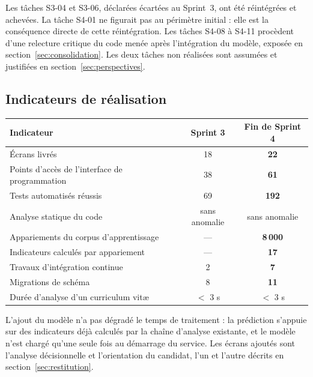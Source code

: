 \documentclass[11pt,a4paper]{article}
\begin{document}
\vspace{2mm}
\noindent Les tâches S3-04 et S3-06, déclarées écartées au Sprint~3, ont été réintégrées et achevées. La tâche S4-01 ne figurait pas au périmètre initial : elle est la conséquence directe de cette réintégration. Les tâches S4-08 à S4-11 procèdent d'une relecture critique du code menée après l'intégration du modèle, exposée en section~\ref{sec:consolidation}. Les deux tâches non réalisées sont assumées et justifiées en section~\ref{sec:perspectives}.

\subsection{Indicateurs de réalisation}

\begin{center}
\small
\begin{tabular}{lcc}
  \toprule
  \textbf{Indicateur} & \textbf{Sprint 3} & \textbf{Fin de Sprint 4} \\
  \midrule
  Écrans livrés & 18 & \textbf{22} \\
  Points d'accès de l'interface de programmation & 38 & \textbf{61} \\
  Tests automatisés réussis & 69 & \textbf{192} \\
  Analyse statique du code & sans anomalie & sans anomalie \\
  Appariements du corpus d'apprentissage & — & \textbf{8\,000} \\
  Indicateurs calculés par appariement & — & \textbf{17} \\
  Travaux d'intégration continue & 2 & \textbf{7} \\
  Migrations de schéma & 8 & \textbf{11} \\
  Durée d'analyse d'un curriculum vitæ & $<$ 3 s & $<$ 3 s \\
  \bottomrule
\end{tabular}
\end{center}

\vspace{1mm}
\noindent L'ajout du modèle n'a pas dégradé le temps de traitement : la prédiction s'appuie sur des indicateurs déjà calculés par la chaîne d'analyse existante, et le modèle n'est chargé qu'une seule fois au démarrage du service. Les écrans ajoutés sont l'analyse décisionnelle et l'orientation du candidat, l'un et l'autre décrits en section~\ref{sec:restitution}.

\end{document}
